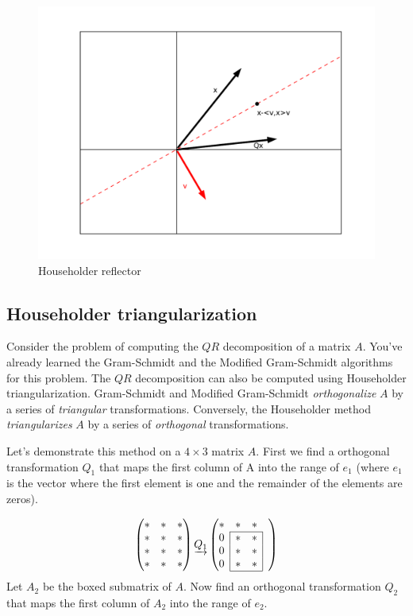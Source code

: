 \begin{figure}
	\centering
	\includegraphics[width= \textwidth]{fig1}
	\caption{Householder reflector}
	\label{fig:Householder reflector}
\end{figure}

\subsection*{Householder triangularization}
Consider the problem of computing the $QR$ decomposition of a matrix $A$. 
You've already learned the Gram-Schmidt and the Modified Gram-Schmidt algorithms for this problem. 
The $QR$ decomposition can also be computed using Householder triangularization.
Gram-Schmidt and Modified Gram-Schmidt \emph{orthogonalize} $A$ by a series of \emph{triangular} transformations.
Conversely, the Householder method \emph{triangularizes} $A$ by a series of \emph{orthogonal} transformations.

Let's demonstrate this method on a $4 \times 3$ matrix $A$. 
First we find a orthogonal transformation $Q_1$ that maps the first column of A into the range of $e_1$ 
(where $e_1$ is the vector where the first element is one and the remainder of the elements are zeros).

\def\mc#1{\multicolumn{1}{c|}{#1}}
\begin{equation*}
\begin{pmatrix}
\ast & \ast & \ast \\
\ast & \ast & \ast \\
\ast & \ast & \ast \\
\ast & \ast & \ast 
\end{pmatrix}
\underrightarrow{Q_1}
\begin{pmatrix}

\ast & \ast & \ast & \\ \cline{2-3}
\mc{0} & \ast & \mc{\ast}& \\
\mc{0} & \ast & \mc{\ast} & \\
\mc{0}& \ast & \mc{\ast} & \\ \cline{2-3}
\end{pmatrix}
\end{equation*}
Let $A_2$ be the boxed submatrix of $A$. 
Now find an orthogonal transformation $Q_2$ that maps the first column of $A_2$ into the range of $e_2$. 


